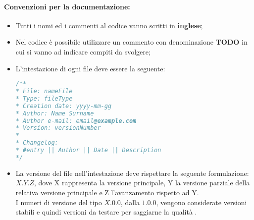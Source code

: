 \paragraph{Convenzioni per la documentazione:}
\begin{itemize}	
	\item Tutti i nomi ed i commenti al codice vanno scritti in \textbf{inglese};
	\item Nel codice è possibile utilizzare un commento con denominazione \textbf{TODO} in cui si vanno ad indicare compiti da svolgere;
	\item L'intestazione di ogni file deve essere la seguente:
	\begin{lstlisting}[language=JavaScript]
/**
* File: nameFile
* Type: fileType
* Creation date: yyyy-mm-gg
* Author: Name Surname
* Author e-mail: email@example.com
* Version: versionNumber 
*
* Changelog:
* #entry || Author || Date || Description
*/
	\end{lstlisting}
	\item La versione del file nell'intestazione deve rispettare la seguente formulazione: $X.Y.Z$, dove X rappresenta la versione principale, Y la versione parziale della relativa versione principale e Z l'avanzamento rispetto ad Y.\\ I numeri di versione del tipo $X.0.0$, dalla $1.0.0$, vengono considerate versioni stabili e quindi versioni da testare per saggiarne la qualità .
\end{itemize}
